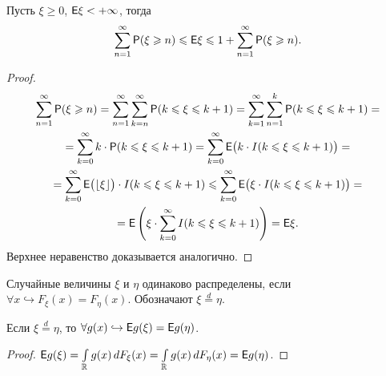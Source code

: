 \begin{lemma}
	Пусть $\xi \geqslant 0$, $\mathsf{E} \xi < + \infty$, тогда 
	$$ \sum\limits_{n=1}^\infty \mathsf{P} (\xi \geqslant n) \leqslant \mathsf{E} \xi \leqslant 1 + \sum\limits_{n = 1}^\infty \mathsf{P} ( \xi \geqslant n).$$
	\begin{proof}
		\begin{multline*}
			\sum\limits_{n = 1}^\infty \mathsf{P} ( \xi \geqslant n) = 
			\sum\limits_{n = 1}^\infty \sum\limits_{k = n}^\infty \mathsf{P} (k \leqslant \xi \leqslant k + 1) = 
			\sum\limits_{k =1}^\infty \sum\limits_{n = 1}^{k} \mathsf{P}( k \leqslant \xi \leqslant k + 1) = \\ = 
			\sum\limits_{k = 0}^{\infty} k \cdot \mathsf{P} ( k \leqslant \xi \leqslant k + 1) = 
			\sum\limits_{k = 0}^\infty \mathsf{E} \big( k \cdot I (k \leqslant \xi  \leqslant k + 1) \big) = \\ = 
			\sum\limits_{k = 0}^\infty \mathsf{E} \big( \lfloor \xi \rfloor \big) \cdot I (k \leqslant \xi \leqslant k + 1 ) \leqslant
			\sum\limits_{k = 0}^\infty \mathsf{E} \big( \xi \cdot I ( k \leqslant \xi \leqslant k+ 1) \big) = \\ =
			\mathsf{E} \left( \xi \cdot \sum\limits_{k = 0}^\infty I (k \leqslant \xi \leqslant k + 1) \right) = \mathsf{E} \xi.
		\end{multline*}
		Верхнее неравенство доказывается аналогично.
	\end{proof}
\end{lemma}

\begin{definition}
	Случайные величины $\xi $ и $\eta$ одинаково распределены, если  $\forall x \hookrightarrow F_\xi (x) = F_\eta(x)$. Обозначают $\xi \overset{d}{=} \eta$.
\end{definition}

\begin{statement}
Если $\xi \overset{d}{=} \eta$, то $\forall g(x) \hookrightarrow \mathsf{E} g(\xi) = \mathsf{E} g(\eta)$.
\begin{proof}
	$\mathsf{E} g(\xi) = \int\limits_{\mathbb{R}} g(x) \, d F_\xi(x) = \int\limits_{\mathbb{R}} g(x) \, d F_\eta(x) = \mathsf{E} g(\eta)$.
\end{proof}	
\end{statement}

